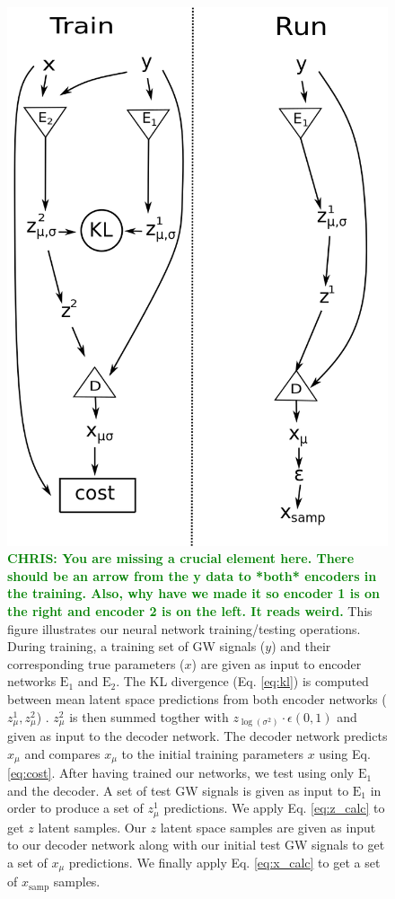 \documentclass[%
showpacs,
 amsmath,amssymb,
 aps,
 twocolumn,
 prl,
 reprint,
floatfix,
]{revtex4-1}
\newcommand{\chris}[1]{\textbf{\textcolor{green}{CHRIS: #1}}}
\begin{document}
\begin{figure}
    \includegraphics[width=\columnwidth]{images/network_setup.png}
    \caption{\label{fig:network_config}\chris{You are missing a crucial element
here. There should be an arrow from the y data to *both* encoders in the
training. Also, why have we made it so encoder 1 is on the right and encoder 2
is on the left. It reads weird.} This figure illustrates our neural network 
    training/testing operations. During training, a training set of GW signals ($y$) 
    and their corresponding true parameters ($x$) are given as input to encoder 
    networks $\textrm{E}_1$ and $\textrm{E}_2$. The KL divergence (Eq. \ref{eq:kl}) 
    is computed between mean latent space predictions from both encoder networks ($z^1_{\mu},z^2_{\mu}$)
    . $z^2_{\mu}$ is then summed togther with $z_{\log{(\sigma^{2})}} \cdot \epsilon(0,1)$ 
    and given as input to the decoder network. The decoder network predicts $x_{\mu}$ 
    and compares $x_{\mu}$ to the initial training parameters $x$ using Eq. \ref{eq:cost}. 
    After having trained our networks, we test using only $\textrm{E}_1$ and the decoder. 
    A set of test GW signals is given as input to $\textrm{E}_1$ in order to 
    produce a set of $z^1_{\mu}$ predictions. We apply Eq. \ref{eq:z_calc} to 
    get $z$ latent samples. Our $z$ latent space samples are given 
    as input to our decoder network along with our initial test GW signals 
    to get a set of $x_{\mu}$ predictions. We finally apply Eq. \ref{eq:x_calc} 
    to get a set of $x_\textrm{samp}$ samples.}
\end{figure}
\end{document}

